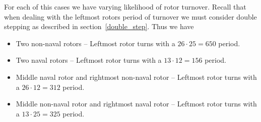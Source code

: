 For each of this cases we have varying likelihood of rotor turnover. Recall that when dealing with the leftmost rotors period of turnover we must consider double stepping as described in section~\ref{double_step}. Thus we have

\begin{itemize}
	\item Two non-naval rotors -- Leftmost rotor turns with a $26\cdot25 = 650$ period.
	\item Two naval rotors --  Leftmost rotor turns with a $13\cdot12 = 156$ period.
	\item Middle naval rotor and rightmost non-naval rotor --  Leftmost rotor turns with a $26\cdot12 = 312$ period.
	\item Middle non-naval rotor and rightmost naval rotor --  Leftmost rotor turns with a $13\cdot25 = 325$ period.
\end{itemize}


